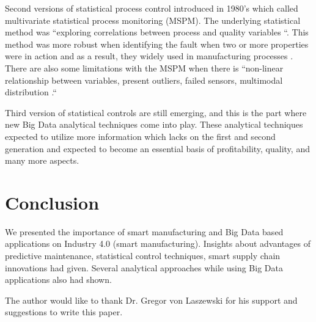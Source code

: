 \documentclass[sigconf]{acmart}
\begin{document}
\par Second versions of statistical process control introduced in 1980's which called multivariate statistical process monitoring (MSPM). The underlying statistical method was ``exploring correlations between process and quality variables \cite{HE2017}``. This method was more robust when identifying the fault when two or more properties were in action and as a result, they widely used in manufacturing processes \cite{HE2017}. There are also some limitations with the MSPM when there is ``non-linear relationship between variables, present outliers, failed sensors, multimodal distribution \cite{HE2017}.``

\par Third version of statistical controls are still emerging, and this is the part where new Big Data analytical techniques come into play. These analytical techniques expected to utilize more information which lacks on the first and second generation and expected to become an essential basis of profitability, quality, and many more aspects.


\section{Conclusion}

We presented the importance of smart manufacturing and Big Data based applications on Industry 4.0 (smart manufacturing). Insights about advantages of predictive maintenance, statistical control techniques, smart supply chain innovations had given. Several analytical approaches while using Big Data applications also had shown.

\begin{acks}

The author would like to thank Dr. Gregor von Laszewski for his support and suggestions to write this paper.

\end{acks}


 
\end{document}
